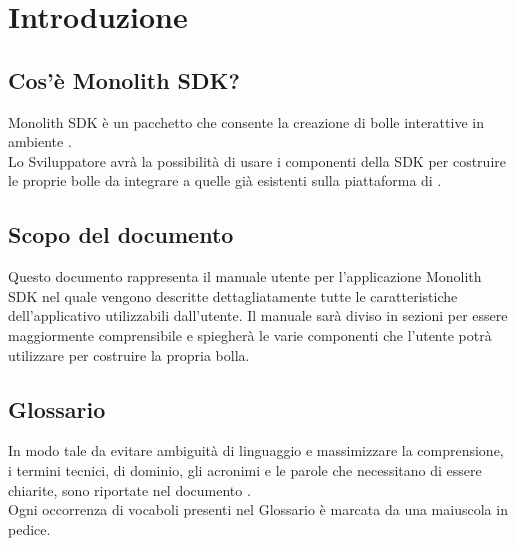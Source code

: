 \section{Introduzione}
\subsection{Cos'è Monolith SDK?}
Monolith SDK è un pacchetto  che consente la creazione di bolle interattive in ambiente .\\
Lo Sviluppatore avrà la possibilità di usare i componenti della SDK per costruire le proprie bolle da integrare a quelle già esistenti sulla piattaforma di . 
\subsection{Scopo del documento}
Questo documento rappresenta il manuale utente per l'applicazione Monolith SDK nel quale vengono descritte dettagliatamente tutte le caratteristiche dell'applicativo utilizzabili dall'utente.
Il manuale sarà diviso in sezioni per essere maggiormente comprensibile e spiegherà le varie componenti che l'utente potrà utilizzare per costruire la propria bolla.
\subsection{Glossario}
In modo tale da evitare ambiguità di linguaggio e massimizzare la comprensione, i termini tecnici, di dominio, gli acronimi e le parole che necessitano di essere chiarite, sono riportate nel documento \gloss .\\
Ogni occorrenza di vocaboli presenti nel Glossario è marcata da una \glossario{} maiuscola in pedice.